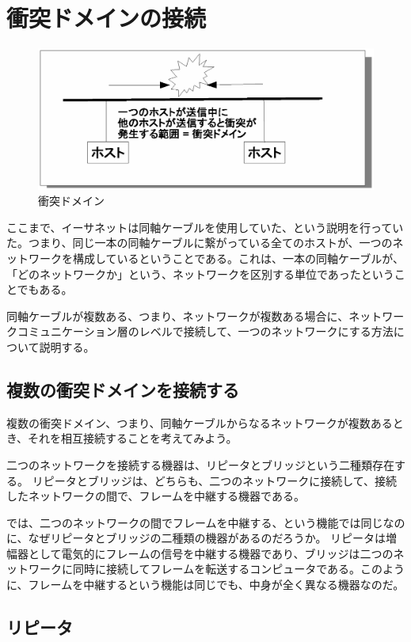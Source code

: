 \section{衝突ドメインの接続}

\begin{figure}[htbp]
	\includegraphics[width=12cm,clip]{draw/collisiondomain.eps}
	\caption{衝突ドメイン}
	\label{fig:collisiondomain}
\end{figure}

ここまで、イーサネットは同軸ケーブルを使用していた、という説明を行っていた。つまり、同じ一本の同軸ケーブルに繋がっている全てのホストが、一つのネットワークを構成しているということである。これは、一本の同軸ケーブルが、「どのネットワークか」という、ネットワークを区別する単位であったということでもある。

同軸ケーブルが複数ある、つまり、ネットワークが複数ある場合に、ネットワークコミュニケーション層のレベルで接続して、一つのネットワークにする方法について説明する。

\subsection{複数の衝突ドメインを接続する}

複数の衝突ドメイン、つまり、同軸ケーブルからなるネットワークが複数あるとき、それを相互接続することを考えてみよう。

二つのネットワークを接続する機器は、リピータとブリッジという二種類存在する。
リピータとブリッジは、どちらも、二つのネットワークに接続して、接続したネットワークの間で、フレームを中継する機器である。

では、二つのネットワークの間でフレームを中継する、という機能では同じなのに、なぜリピータとブリッジの二種類の機器があるのだろうか。
リピータは増幅器として電気的にフレームの信号を中継する機器であり、ブリッジは二つのネットワークに同時に接続してフレームを転送するコンピュータである。このように、フレームを中継するという機能は同じでも、中身が全く異なる機器なのだ。

\subsection{リピータ}

